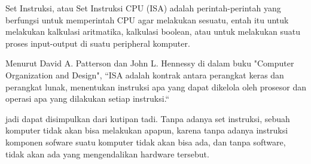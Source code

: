 Set Instruksi, atau Set Instruksi CPU (ISA) adalah perintah-perintah yang berfungsi untuk
memperintah CPU agar melakukan sesuatu, entah itu untuk melakukan kalkulasi aritmatika,
kalkulasi boolean, atau untuk melakukan suatu proses input-output di suatu peripheral komputer.

Menurut David A. Patterson dan John L. Hennessy di dalam buku "Computer Organization and Design",
``ISA adalah kontrak antara perangkat keras dan perangkat lunak, menentukan instruksi apa yang
dapat dikelola oleh prosesor dan operasi apa yang dilakukan setiap instruksi.``

jadi dapat disimpulkan dari kutipan tadi. Tanpa adanya set instruksi,
sebuah komputer tidak akan bisa melakukan apapun, karena tanpa adanya instruksi
komponen sofware suatu komputer tidak akan bisa ada, dan tanpa software, tidak akan
ada yang mengendalikan hardware tersebut.
